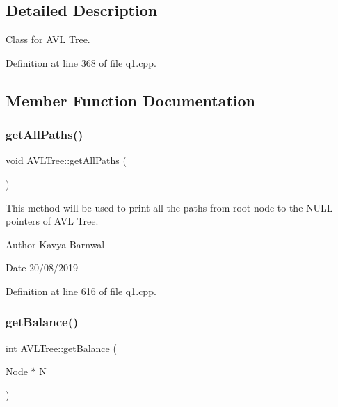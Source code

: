 \subsection{Detailed Description}
Class for A\+VL Tree. 

Definition at line 368 of file q1.\+cpp.



\subsection{Member Function Documentation}
\mbox{\label{class_a_v_l_tree_acfeb6a8c2b2ddd309747a7f5d402e2ed}} 
\subsubsection{\texorpdfstring{get\+All\+Paths()}{getAllPaths()}}
{\footnotesize\ttfamily void A\+V\+L\+Tree\+::get\+All\+Paths (\begin{DoxyParamCaption}{ }\end{DoxyParamCaption})\hspace{0.3cm}{\ttfamily [inline]}}

This method will be used to print all the paths from root node to the N\+U\+LL pointers of A\+VL Tree. \begin{DoxyAuthor}{Author}
Kavya Barnwal 
\end{DoxyAuthor}
\begin{DoxyDate}{Date}
20/08/2019 
\end{DoxyDate}


Definition at line 616 of file q1.\+cpp.

\mbox{\label{class_a_v_l_tree_aff1b11f5d1e3b013877c1fc1ace0b6a8}} 
\subsubsection{\texorpdfstring{get\+Balance()}{getBalance()}}
{\footnotesize\ttfamily int A\+V\+L\+Tree\+::get\+Balance (\begin{DoxyParamCaption}\item[{\hyperlink{class_node}{Node} $\ast$}]{N }\end{DoxyParamCaption})\hspace{0.3cm}{\ttfamily [inline]}}

